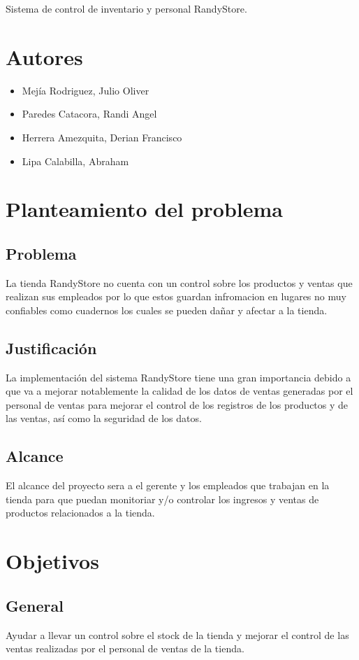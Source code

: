 \documentclass[12pt,letterpaper]{article}
\begin{document}
Sistema de control de inventario y personal RandyStore.

\section{Autores} 
\begin{itemize}
    \item Mej\'ia Rodriguez, Julio Oliver    
    \item Paredes Catacora, Randi Angel 
    \item Herrera Amezquita, Derian Francisco
    \item Lipa Calabilla, Abraham
\end{itemize}

\section{Planteamiento del problema} 
    \subsection{Problema}
    La tienda RandyStore no cuenta con un control sobre los productos y ventas que realizan sus empleados   
    por lo que estos guardan infromacion en lugares no muy confiables como cuadernos los cuales se pueden dañar 
    y afectar a la tienda.
    \subsection{Justificación}
    La implementación del sistema RandyStore tiene una gran importancia debido a que va a mejorar notablemente la calidad de los datos de ventas generadas por el personal de ventas para mejorar el control de los registros de los productos y de las ventas, así como la seguridad de los datos.
    \subsection{Alcance}
    El alcance del proyecto sera a el gerente y los empleados que trabajan en la tienda para que puedan monitoriar
    y/o controlar los ingresos y ventas de productos relacionados a la tienda.
\section{Objetivos}
    \subsection{General}
    Ayudar a llevar un control sobre el stock de la tienda y mejorar el control de las ventas realizadas por el personal de ventas de la tienda.
\end{document}
